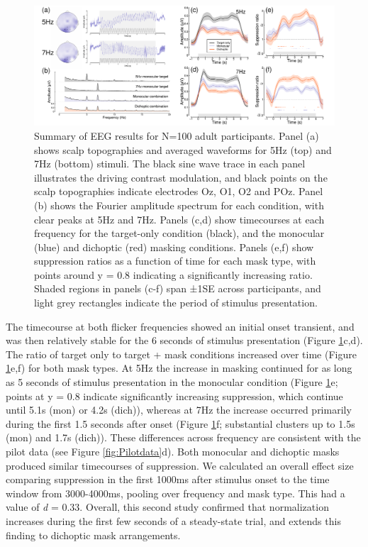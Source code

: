 \documentclass[
]{article}
\begin{document}
\begin{figure}

{\centering \includegraphics{Figures/EEGdata} 

}

\caption{Summary of EEG results for N=100 adult participants. Panel (a) shows scalp topographies and averaged waveforms for 5Hz (top) and 7Hz (bottom) stimuli. The black sine wave trace in each panel illustrates the driving contrast modulation, and black points on the scalp topographies indicate electrodes Oz, O1, O2 and POz. Panel (b) shows the Fourier amplitude spectrum for each condition, with clear peaks at 5Hz and 7Hz. Panels (c,d) show timecourses at each frequency for the target-only condition (black), and the monocular (blue) and dichoptic (red) masking conditions. Panels (e,f) show suppression ratios as a function of time for each mask type, with points around y = 0.8 indicating a significantly increasing ratio. Shaded regions in panels (c-f) span ±1SE across participants, and light grey rectangles indicate the period of stimulus presentation.}\label{fig:EEGdata}
\end{figure}

The timecourse at both flicker frequencies showed an initial onset transient, and was then relatively stable for the 6 seconds of stimulus presentation (Figure \ref{fig:EEGdata}c,d). The ratio of target only to target + mask conditions increased over time (Figure \ref{fig:EEGdata}e,f) for both mask types. At 5Hz the increase in masking continued for as long as 5 seconds of stimulus presentation in the monocular condition (Figure \ref{fig:EEGdata}e; points at y = 0.8 indicate significantly increasing suppression, which continue until 5.1s (mon) or 4.2s (dich)), whereas at 7Hz the increase occurred primarily during the first 1.5 seconds after onset (Figure \ref{fig:EEGdata}f; substantial clusters up to 1.5s (mon) and 1.7s (dich)). These differences across frequency are consistent with the pilot data (see Figure \ref{fig:Pilotdata}d). Both monocular and dichoptic masks produced similar timecourses of suppression. We calculated an overall effect size comparing suppression in the first 1000ms after stimulus onset to the time window from 3000-4000ms, pooling over frequency and mask type. This had a value of \emph{d} = 0.33. Overall, this second study confirmed that normalization increases during the first few seconds of a steady-state trial, and extends this finding to dichoptic mask arrangements.
\end{document}
